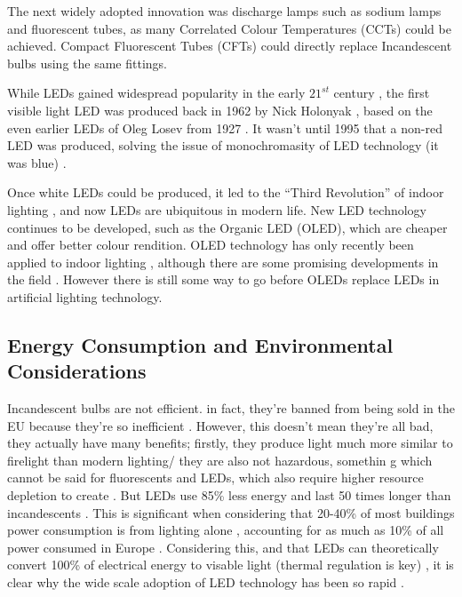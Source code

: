 The next widely adopted innovation was discharge lamps such as sodium lamps and fluorescent tubes, as many Correlated Colour Temperatures (CCTs) could be achieved. Compact Fluorescent Tubes (CFTs) could directly replace Incandescent bulbs using the same fittings.

While LEDs gained widespread popularity in the early $21^{st}$ century \citep{matsumotoMeasuringHouseholdAbility2020}, the first visible light LED was produced back in 1962 by Nick Holonyak \citep{holonyakCOHERENTVISIBLELIGHT1962}, based on the even earlier LEDs of Oleg Losev from 1927 \citep{zheludevLifeTimesLED2007}. It wasn't until 1995 that a non-red LED was produced, solving the issue of monochromasity of LED technology (it was blue) \citep{nakamuraInGaNAlGaNBlue1995}.

Once white LEDs could be produced, it led to the ``Third Revolution'' of indoor lighting \citep{montoyaIndoorLightingTechniques2017}, and now LEDs are ubiquitous in modern life. New LED technology continues to be developed, such as the Organic LED (OLED), which are cheaper and offer better colour rendition. OLED technology has only recently been applied to indoor lighting \citep{phelanOLEDLightingHits2018}, although there are some promising developments in the field \citep{benderSolidStateLightingConcise2015}. However there is still some way to go before OLEDs replace LEDs in artificial lighting technology.

\subsection{Energy Consumption and Environmental Considerations}
\label{sec:Energy}

Incandescent bulbs are not efficient. in fact, they're banned from being sold in the EU because they're so inefficient \citep{euDirective2012272012}. However, this doesn't mean they're all bad, they actually have many benefits; firstly, they produce light much more similar to firelight than modern lighting/ they are also not hazardous, somethin g which cannot be said for fluorescents and LEDs, which also require higher resource depletion to create \citep{limPotentialEnvironmentalImpacts2013}. But LEDs use 85\% less energy and last 50 times longer than incandescents \citep{mottierLEDLightingApplications2010}. This is significant when considering that 20-40\% of most buildings power consumption is from lighting alone \citep{perez-lombardReviewBuildingsEnergy2008}, accounting for as much as 10\% of all power consumed in Europe \citep{bertoldiEnergyEfficiencyStatus2012}. Considering  this, and that LEDs can theoretically convert 100\% of electrical energy to visable light (thermal regulation is key) \citep{jordanChallengesLEDPackaging2012}, it is clear why the wide scale adoption of LED technology has been so rapid \citep{matsumotoMeasuringHouseholdAbility2020}.



